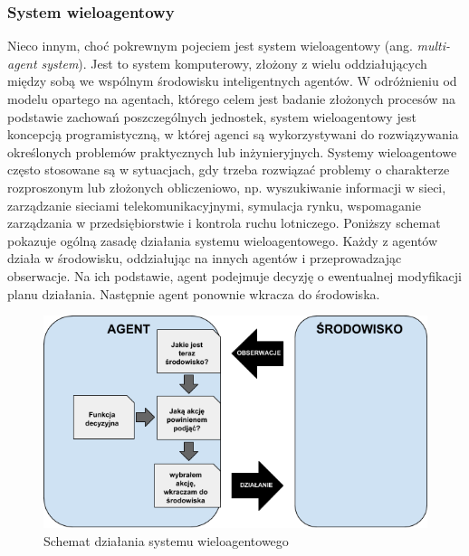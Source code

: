 \subsubsection{System wieloagentowy}
    Nieco innym, choć pokrewnym pojeciem jest system wieloagentowy (ang. \textit{multi-agent system}). Jest to system komputerowy, złożony z wielu oddziałujących między sobą we wspólnym środowisku inteligentnych agentów. W odróżnieniu od modelu opartego na agentach, którego celem jest badanie złożonych procesów na podstawie zachowań poszczególnych jednostek, system wieloagentowy jest koncepcją programistyczną, w której agenci są wykorzystywani do rozwiązywania określonych problemów praktycznych lub inżynieryjnych. Systemy wieloagentowe często stosowane są w sytuacjach, gdy trzeba rozwiązać problemy o charakterze rozproszonym lub złożonych obliczeniowo, np. wyszukiwanie informacji w sieci, zarządzanie sieciami telekomunikacyjnymi, symulacja rynku, wspomaganie zarządzania w przedsiębiorstwie i kontrola ruchu lotniczego\cite{wiki-agent}. Poniższy schemat pokazuje ogólną zasadę działania systemu wieloagentowego. Każdy z agentów działa w środowisku, oddziałując na innych agentów i przeprowadzając obserwacje. Na ich podstawie, agent podejmuje decyzję o ewentualnej modyfikacji planu działania. Następnie agent ponownie wkracza do środowiska.
    \begin{figure}[h]
        \caption{Schemat działania systemu wieloagentowego}
        \includegraphics[width=\textwidth]{images/mopsim/multi-agent.png}
    \end{figure}
